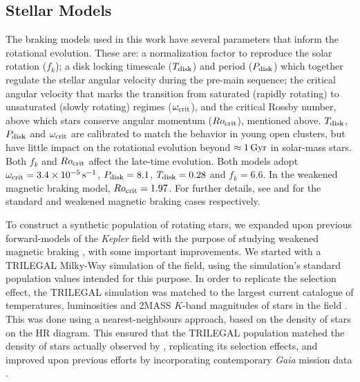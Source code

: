 \subsection{Stellar Models}\label{ssec:models}
The braking models used in this work have several parameters that inform the rotational evolution. These are: a normalization factor to reproduce the solar rotation ($f_k$); a disk locking timescale ($T_{\rm disk}$) and period ($P_{\rm disk}$) which together regulate the stellar angular velocity during the pre-main sequence; the critical angular velocity that marks the transition from saturated (rapidly rotating) to unsaturated (slowly rotating) regimes ($\omega_{\rm crit}$), and the critical Rossby number, above which stars conserve angular momentum ($Ro_{\rm crit}$), mentioned above. $T_{\rm disk}$, $P_{\rm disk}$ and $\omega_{\rm crit}$ are calibrated to match the behavior in young open clusters, but have little impact on the rotational evolution beyond $\approx 1\, \rm{Gyr}$ in solar-mass stars. Both $f_k$ and $Ro_{\rm crit}$ affect the late-time evolution. Both models adopt $\omega_{\rm crit} = 3.4  \times 10^{-5}\, \rm{s}^{-1}$, $P_{\rm disk} = 8.1$, $T_{\rm disk} = 0.28$ and $f_k = 6.6$. In the weakened magnetic braking model, $Ro_{\rm crit} = 1.97$.  For further details, see \cite{m_vansaders+pinsonneault2013} and \cite{m_vansaders+2016, m_vansaders+2019} for the standard and weakened magnetic braking cases respectively.

To construct a synthetic population of rotating stars, we expanded upon previous forward-models of the \textit{Kepler} field with the purpose of studying weakened magnetic braking \cite{m_vansaders+2019}, with some important improvements. We started with a TRILEGAL \cite{m_girardi+2012} Milky-Way simulation of the \kepler field, using the simulation's standard population values intended for this purpose. In order to replicate the \kepler selection effect, the TRILEGAL simulation was matched to the largest current catalogue of temperatures, luminosities and 2MASS $K$-band magnitudes of stars in the \kepler field \cite{m_berger+2020}. This was done using a nearest-neighbours approach, based on the density of stars on the HR diagram. This ensured that the TRILEGAL population matched the density of stars actually observed by \kepler, replicating its selection effects, and improved upon previous efforts \cite{m_vansaders+2019} by incorporating contemporary \textit{Gaia} mission data \cite{m_gaiacollaboration+2018}.

